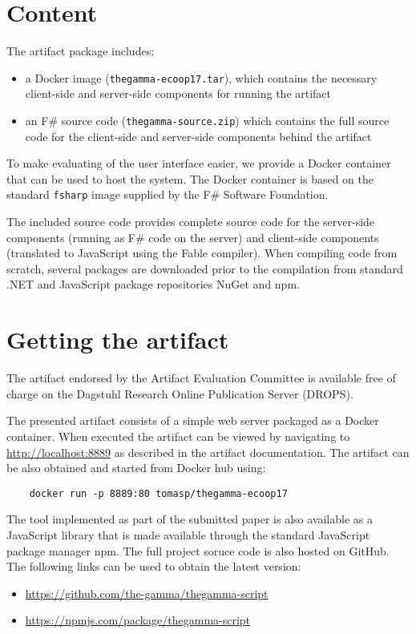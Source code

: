 \documentclass[a4paper,UKenglish]{darts}
\newenvironment{content}{\section{Content}}{}
\newenvironment{getting}{\section{Getting the artifact} The artifact 
endorsed by the Artifact Evaluation Committee is available free of 
charge on the Dagstuhl Research Online Publication Server (DROPS).}{}
\begin{document}
\begin{content}
The artifact package includes:
\begin{itemize}
\item a Docker image ({\tt thegamma-ecoop17.tar}), which contains the necessary client-side
  and server-side components for running the artifact
\item an F\# source code ({\tt thegamma-source.zip}) which contains the full source code for 
  the client-side and server-side components behind the artifact
\end{itemize}
To make evaluating of the user interface easier, we provide a Docker container that
can be used to host the system. The Docker container is based on the standard {\tt fsharp} 
image supplied by the F\# Software Foundation. 

The included source code provides complete source code
for the server-side components (running as F\# code on the server) and client-side components
(translated to JavaScript using the Fable compiler). When compiling code from scratch, several
packages are downloaded prior to the compilation from standard .NET and JavaScript package
repositories NuGet and npm.
\end{content} 

\begin{getting}

The presented artifact consists of a simple web server packaged as a Docker container. When
executed the artifact can be viewed by navigating to \url{http://localhost:8889} as described
in the artifact documentation. The artifact can be also obtained and started from
Docker hub using:

\begin{verbatim}
    docker run -p 8889:80 tomasp/thegamma-ecoop17
\end{verbatim}

\noindent
The tool implemented as part of the submitted paper is also available as a JavaScript library
that is made available through the standard JavaScript package manager npm. The full
project soruce code is also hosted on GitHub. The following links can be used to obtain the latest
version:
\begin{itemize}
  \item \url{https://github.com/the-gamma/thegamma-script}
  \item \url{https://npmjs.com/package/thegamma-script}
\end{itemize}

\end{getting} 
\end{document}
